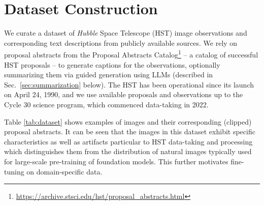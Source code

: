 \documentclass{article} %
\newcommand{\hubble}{\emph{Hubble}\xspace}
\newcommand{\datafolder}[1]{\def\thedatafolder{#1}}
\begin{document}
   \section{Dataset Construction}
   \label{sec:dataset}
   
   We curate a dataset of \hubble Space Telescope (HST) image observations and corresponding text descriptions from publicly available sources.
   We rely on proposal abstracts from the Proposal Abstracts Catalog\footnote{\url{https://archive.stsci.edu/hst/proposal_abstracts.html}} -- a catalog of successful HST proposals -- to generate captions for the observations, optionally summarizing them via guided generation using LLMs (described in Sec.~\ref{sec:summarization} below).
   The HST has been operational since its launch on April 24, 1990, and we use available proposals and observations up to the Cycle 30 science program, which commenced data-taking in 2022.
   
   Table \ref{tab:dataset} shows examples of images and their corresponding (clipped) proposal abstracts.
   It can be seen that the images in this dataset exhibit specific characteristics as well as artifacts particular to HST data-taking and processing which distinguishes them from the distribution of natural images typically used for large-scale pre-training of foundation models.
   This further motivates fine-tuning on domain-specific data.
   
   \datafolder{./plots/data/}
   
\end{document}
